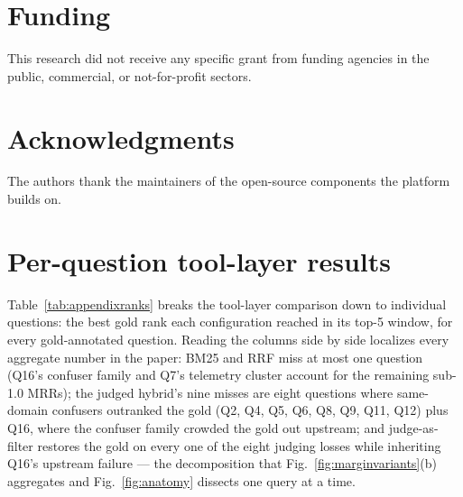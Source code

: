\section*{Funding}
This research did not receive any specific grant from funding agencies in
the public, commercial, or not-for-profit sectors. %

\section*{Acknowledgments}
The authors thank the maintainers of the open-source components the platform
builds on. %

\appendix
\setcounter{table}{0}
\section{Per-question tool-layer results}
\label{app:perq}
Table~\ref{tab:appendixranks} breaks the tool-layer comparison down to
individual questions: the best gold rank each configuration reached in
its top-5 window, for every gold-annotated question. Reading the columns
side by side localizes every aggregate number in the paper: BM25 and RRF
miss at most one question (Q16's confuser family and Q7's telemetry
cluster account for the remaining sub-1.0 MRRs); the judged hybrid's nine
misses are eight questions where same-domain confusers outranked
the gold (Q2, Q4, Q5, Q6, Q8, Q9, Q11, Q12) plus Q16, where the confuser
family crowded the gold out upstream;
and judge-as-filter restores the gold on every one of the eight
judging losses while inheriting Q16's upstream failure --- the
decomposition that Fig.~\ref{fig:marginvariants}(b) aggregates and
Fig.~\ref{fig:anatomy} dissects one query at a time.




